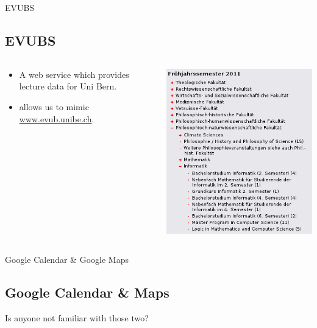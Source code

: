 \documentclass{beamer}
\begin{document}
\begin{frame}{EVUBS}

	\subsection{EVUBS}

	\begin{columns}
		\begin{column}{0.5\textwidth}
			\begin{itemize}
				\item A web service which provides lecture data for Uni Bern.
				\item allows us to mimic \url{www.evub.unibe.ch}.
			\end{itemize}
		\end{column}

		\begin{column}{0.5\textwidth}
			\includegraphics[scale=0.5]{evub.png} 
		\end{column}
	\end{columns}

\end{frame}

\begin{frame}{Google Calendar \& Google Maps}
	\subsection{Google Calendar \& Maps}
	Is anyone not familiar with those two?
\end{frame}
\end{document}
